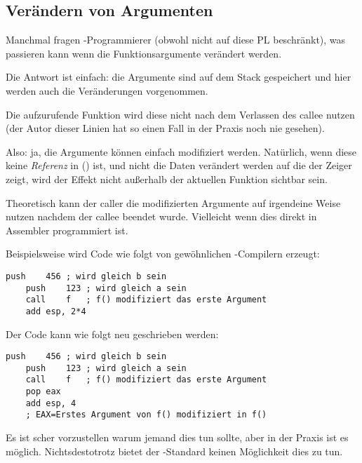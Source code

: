 \subsection{Verändern von Argumenten}

Manchmal fragen \CCpp{}-Programmierer (obwohl nicht auf diese \ac{PL} beschränkt),
was passieren kann wenn die Funktionsargumente verändert werden.

Die Antwort ist einfach: die Argumente sind auf dem Stack gespeichert und hier
werden auch die Veränderungen vorgenommen.

Die aufzurufende Funktion wird diese nicht nach dem Verlassen des \gls{callee}
nutzen (der Autor dieser Linien hat so einen Fall in der Praxis noch nie gesehen).



%



Also: ja, die Argumente können einfach modifiziert werden.
Natürlich, wenn diese keine \emph{Referenz} in  \Cpp{} () ist,
und nicht die Daten verändert werden auf die der Zeiger zeigt, wird der Effekt nicht
außerhalb der aktuellen Funktion sichtbar sein.

Theoretisch kann der \gls{caller} die modifizierten Argumente auf irgendeine Weise
nutzen nachdem der \gls{callee} beendet wurde.
Vielleicht wenn dies direkt in Assembler programmiert ist.

Beispielsweise wird Code wie folgt von gewöhnlichen \CCpp-Compilern erzeugt:

\begin{lstlisting}[style=customasmx86]
	push	456	; wird gleich b sein
	push	123	; wird gleich a sein
	call	f	; f() modifiziert das erste Argument
	add	esp, 2*4
\end{lstlisting}

Der Code kann wie folgt neu geschrieben werden:

\begin{lstlisting}[style=customasmx86]
	push	456	; wird gleich b sein
	push	123	; wird gleich a sein
	call	f	; f() modifiziert das erste Argument
	pop	eax
	add	esp, 4
	; EAX=Erstes Argument von f() modifiziert in f()
\end{lstlisting}

Es ist scher vorzustellen warum jemand dies tun sollte, aber in der Praxis ist es möglich.
Nichtsdestotrotz bietet der \CCpp-Standard keinen Möglichkeit dies zu tun.


%
%

